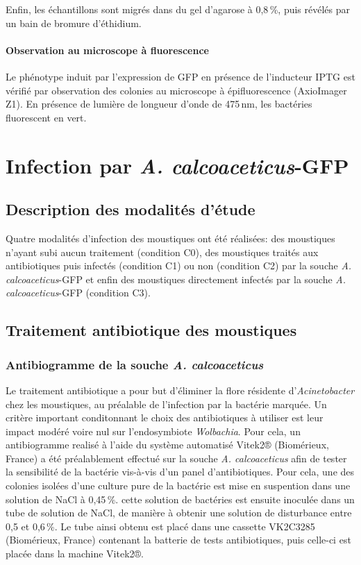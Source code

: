 Enfin, les échantillons sont migrés dans du gel d'agarose à 0,8\,\%, puis révélés par un bain de bromure d'éthidium.

\paragraph{Observation au microscope à fluorescence}
Le phénotype induit par l'expression de GFP en présence de l'inducteur IPTG est vérifié par observation des colonies au microscope à épifluorescence (AxioImager Z1). En présence de lumière de longueur d'onde de 475\,nm, les bactéries fluorescent en vert.

\section{Infection par \textit{A. calcoaceticus}-GFP}

\subsection{Description des modalités d'étude}

Quatre modalités d'infection des moustiques ont été réalisées: des moustiques n'ayant subi aucun traitement (condition C0), des moustiques traités aux antibiotiques puis infectés (condition C1) ou non (condition C2) par la souche \textit{A. calcoaceticus}-GFP et enfin des moustiques directement infectés par la souche \textit{A. calcoaceticus}-GFP (condition C3).

\subsection{Traitement antibiotique des moustiques}

\subsubsection{Antibiogramme de la souche \textit{A. calcoaceticus}}

Le traitement antibiotique a pour but d'éliminer la flore résidente d'\textit{Acinetobacter} chez les moustiques, au préalable de l'infection par la bactérie marquée.
Un critère important conditonnant le choix des antibiotiques à utiliser est leur impact modéré voire nul sur l'endosymbiote \textit{Wolbachia}.
Pour cela, un antibiogramme realisé à l'aide du système automatisé Vitek2® (Biomérieux, France) a été préalablement effectué sur la souche \textit{A. calcoaceticus} afin de tester la sensibilité de la bactérie vis-à-vis d'un panel d'antibiotiques.
Pour cela, une des colonies isolées d'une culture pure de la bactérie est mise en suspention dans une solution de NaCl à 0,45\,\%.
cette solution de bactéries est ensuite inoculée dans un tube de solution de NaCl, de manière à obtenir une solution de disturbance entre 0,5 et 0,6\,\%.
Le tube ainsi obtenu est placé dans une cassette VK2C3285 (Biomérieux, France) contenant la batterie de tests antibiotiques, puis celle-ci est placée dans la machine Vitek2®.

